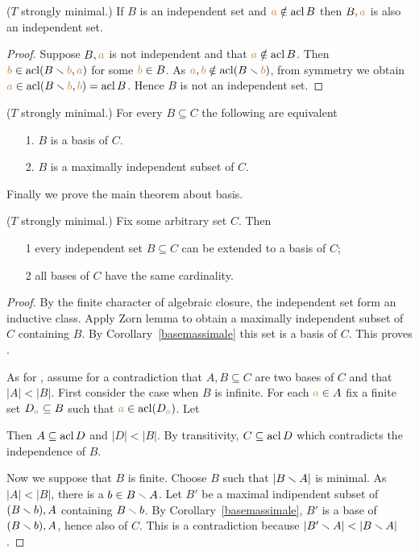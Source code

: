 \begin{lemma}\label{indipendenza+1}
($T$ strongly minimal.) If $B$ is an independent set and ${\color{brown} a}\notin \mathop{\rm acl} B$ then $B,{\color{brown} a}$ is also an independent set.
\end{lemma}
\begin{proof}
Suppose $B,{\color{brown} a}$ is not independent and that ${\color{brown} a}\notin \mathop{\rm acl} B$.
Then ${\color{brown} b}\in\mathop{\rm acl}(B\smallsetminus {\color{brown}b},{\color{brown} a})$ for some ${\color{brown} b}\in B$.
As ${\color{brown} a},{\color{brown} b}\notin\mathop{\rm acl}(B\smallsetminus {\color{brown}b})$, from symmetry we obtain ${\color{brown} a}\in\mathop{\rm acl}(B\smallsetminus {\color{brown}b},{\color{brown} b})=\mathop{\rm acl} B$.
Hence $B$ is not an independent set.
\end{proof}

\begin{corollary}\label{basemassimale}
($T$ strongly minimal.) For every $B\subseteq C$ the following are equivalent
\begin{itemize}
\item[1.] $B$ is a basis of $C$.
\item[2.] $B$ is a maximally independent subset of $C$.\QED
\end{itemize}
\end{corollary}

Finally we prove the main theorem about basis.

\begin{theorem} ($T$ strongly minimal.) Fix some arbitrary set $C$. Then
  \begin{itemize}
  \item[1] every independent set $B\subseteq C$ can be extended to a basis of $C$;
  \item[2] all bases of $C$ have the same cardinality.
  \end{itemize}
\end{theorem}

\begin{proof}
  By the finite character of algebraic closure, the independent set form an inductive class.
  Apply Zorn lemma to obtain a maximally independent subset of $C$ containing $B$.
  By Corollary~\ref{basemassimale} this set is a basis of $C$.
  This proves .

  As for , assume for a contradiction that $A,B\subseteq C$ are two bases of $C$ and that $|A|<|B|$.
  First consider the case when $B$ is infinite.
  For each ${\color{brown} a}\in A$ fix a finite set $D_{\color{brown} a}\subseteq B$ such that ${\color{brown} a}\in\mathop{\rm acl}(D_{\color{brown} a})$.
  Let


  Then $A\subseteq\mathop{\rm acl} D$ and $|D|<|B|$.
  By transitivity, $C\subseteq\mathop{\rm acl} D$ which contradicts the independence of $B$.

  Now we suppose that $B$ is finite.
  Choose $B$ such that $|B\smallsetminus A|$ is minimal.
  As $|A|<|B|$, there is a $b\in B\smallsetminus A$.
  Let $B'$ be a maximal indipendent subset of $(B\smallsetminus b),A$ containing $B\smallsetminus b$.
  By Corollary~\ref{basemassimale}, $B'$ is a base of $(B\smallsetminus b),A$, hence also of $C$.
  This is a contradiction because $|B'\sm A|<|B\sm A|$.
\end{proof}

